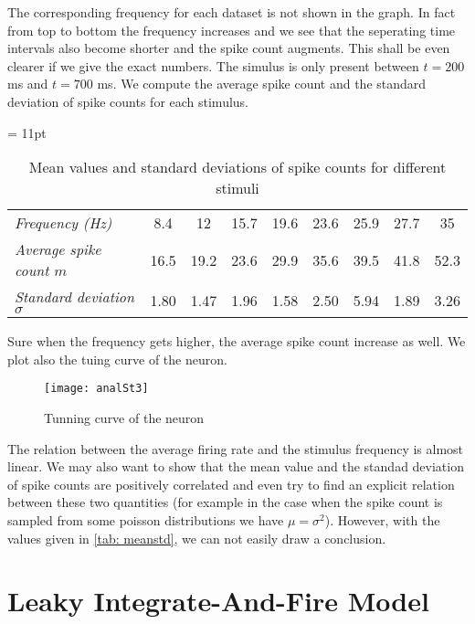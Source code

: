 The corresponding frequency for each dataset is not shown in the graph. In 
fact from top to bottom the frequency increases and we see that the seperating
time intervals also become shorter and the spike count augments. This shall be
even clearer if we give the exact numbers. The simulus is only present between
$t = 200$ ms and $t = 700$ ms. We compute the average spike count and the
standard deviation of spike counts for each stimulus.

\vspace{1em}
\begin{table}[h]
  \tabcolsep = 11pt
  \caption
    {Mean values and standard deviations of spike counts for different stimuli}
  \label{tab: meanstd}
  \begin{tabular*}{\linewidth}{>{\it}lcccccccc}
    \toprule
    Frequency (Hz) & 8.4 & 12 & 15.7 & 19.6 & 23.6 & 25.9 & 27.7 & 35 \\ 
    Average spike count $m$ 
    & 16.5 & 19.2 & 23.6 & 29.9 & 35.6 & 39.5 & 41.8 & 52.3 \\
    Standard deviation $\sigma$ 
    & 1.80 & 1.47 & 1.96 & 1.58 & 2.50 & 5.94 & 1.89 & 3.26 \\
    \bottomrule
  \end{tabular*}
\end{table}
\vspace{0.4em}

Sure when the frequency gets higher, the average spike count increase as well.
We plot also the tuing curve of the neuron. 

\begin{figure}[H]
  \centering
  \texttt{[image: analSt3]}
  \caption{Tunning curve of the neuron}
\end{figure}

The relation between the average firing rate and the stimulus frequency is
almost linear. We may also want to show that the mean value and the standad
deviation of spike counts are positively correlated and even try to find an
explicit relation between these two quantities (for example in the case when 
the spike count is sampled from some poisson distributions we have 
$\mu = \sigma^2$). However, with the values given in \autoref{tab: meanstd}, 
we can not easily draw a conclusion.


\section{Leaky Integrate-And-Fire Model}

